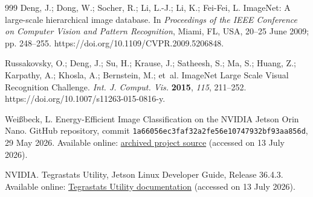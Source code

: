 \documentclass[electronics,article,submit,pdftex,moreauthors]{Definitions/mdpi}
\newcommand{\etal}{et~al.}
\begin{document}
\begin{thebibliography}{999}
Deng, J.; Dong, W.; Socher, R.; Li, L.-J.; Li, K.; Fei-Fei, L. ImageNet: A large-scale hierarchical image database. In \emph{Proceedings of the IEEE Conference on Computer Vision and Pattern Recognition}, Miami, FL, USA, 20--25 June 2009; pp. 248--255. https://doi.org/10.1109/CVPR.2009.5206848.

Russakovsky, O.; Deng, J.; Su, H.; Krause, J.; Satheesh, S.; Ma, S.; Huang, Z.; Karpathy, A.; Khosla, A.; Bernstein, M.; \etal{} ImageNet Large Scale Visual Recognition Challenge. \emph{Int. J. Comput. Vis.} \textbf{2015}, \emph{115}, 211--252. https://doi.org/10.1007/s11263-015-0816-y.

Wei{\ss}beck, L. Energy-Efficient Image Classification on the NVIDIA Jetson Orin Nano. GitHub repository, commit \texttt{1a66056ec3faf32a2fe56e10747932bf93aa856d}, 29 May 2026. Available online: \href{https://github.com/weissbeck-lucas/ki-labor/tree/1a66056ec3faf32a2fe56e10747932bf93aa856d/projects/jetson-orin-nano-energy-benchmark}{archived project source} (accessed on 13 July 2026).

NVIDIA. Tegrastats Utility, Jetson Linux Developer Guide, Release 36.4.3. Available online: \href{https://docs.nvidia.com/jetson/archives/r36.4.3/DeveloperGuide/AT/JetsonLinuxDevelopmentTools/TegrastatsUtility.html}{Tegrastats Utility documentation} (accessed on 13 July 2026).

\end{thebibliography}

\PublishersNote{}
\end{document}
